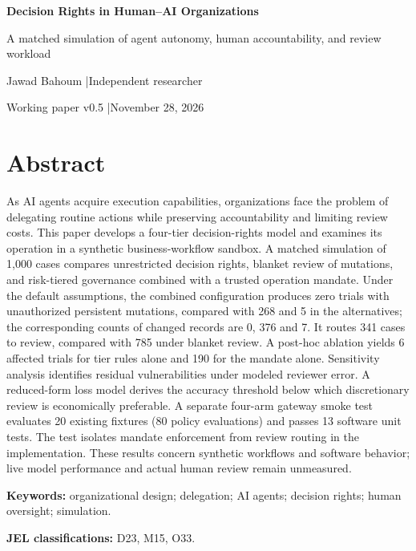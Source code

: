 \documentclass[11pt,letterpaper]{article}
\begin{document}
\thispagestyle{plain}
\begin{center}
{\LARGE\bfseries Decision Rights in Human--AI Organizations\par}
\vspace{5pt}
{\large A matched simulation of agent autonomy, human accountability, and review workload\par}
\vspace{10pt}
{\normalsize Jawad Bahoum \quad|\quad Independent researcher\par}
{\small Working paper v0.5 \quad|\quad November 28, 2026\par}
\end{center}
\vspace{5pt}

\section*{Abstract}
As AI agents acquire execution capabilities, organizations face the problem of delegating routine actions while preserving accountability and limiting review costs. This paper develops a four-tier decision-rights model and examines its operation in a synthetic business-workflow sandbox. A matched simulation of 1,000 cases compares unrestricted decision rights, blanket review of mutations, and risk-tiered governance combined with a trusted operation mandate. Under the default assumptions, the combined configuration produces zero trials with unauthorized persistent mutations, compared with 268 and 5 in the alternatives; the corresponding counts of changed records are 0, 376 and 7. It routes 341 cases to review, compared with 785 under blanket review. A post-hoc ablation yields 6 affected trials for tier rules alone and 190 for the mandate alone. Sensitivity analysis identifies residual vulnerabilities under modeled reviewer error. A reduced-form loss model derives the accuracy threshold below which discretionary review is economically preferable. A separate four-arm gateway smoke test evaluates 20 existing fixtures (80 policy evaluations) and passes 13 software unit tests. The test isolates mandate enforcement from review routing in the implementation. These results concern synthetic workflows and software behavior; live model performance and actual human review remain unmeasured.

\noindent\textbf{Keywords:} organizational design; delegation; AI agents; decision rights; human oversight; simulation.\par\noindent\textbf{JEL classifications:} D23, M15, O33.
\end{document}
